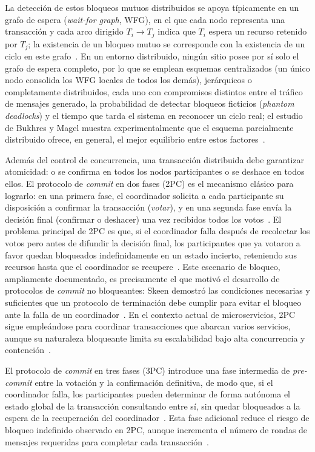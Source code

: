 \documentclass[11pt,a4paper]{article}
\begin{document}
La detecci\'on de estos bloqueos mutuos distribuidos se apoya t\'ipicamente
en un grafo de espera (\emph{wait-for graph}, WFG), en el que cada nodo
representa una transacci\'on y cada arco dirigido $T_i \rightarrow T_j$
indica que $T_i$ espera un recurso retenido por $T_j$; la existencia de un
bloqueo mutuo se corresponde con la existencia de un ciclo en este
grafo~\cite{bukhres1991,ozsu2020}. En un entorno distribuido, ning\'un sitio posee
por s\'i solo el grafo de espera completo, por lo que se emplean esquemas
centralizados (un \'unico nodo consolida los WFG locales de todos los
dem\'as), jer\'arquicos o completamente distribuidos, cada uno con
compromisos distintos entre el tr\'afico de mensajes generado, la
probabilidad de detectar bloqueos ficticios (\emph{phantom deadlocks}) y el
tiempo que tarda el sistema en reconocer un ciclo real; el estudio de
Bukhres y Magel muestra experimentalmente que el esquema parcialmente
distribuido ofrece, en general, el mejor equilibrio entre estos
factores~\cite{bukhres1991,vansteen2017}.

Adem\'as del control de concurrencia, una transacci\'on distribuida debe
garantizar atomicidad: o se confirma en todos los nodos participantes o se
deshace en todos ellos. El protocolo de \emph{commit} en dos fases (2PC) es
el mecanismo cl\'asico para lograrlo: en una primera fase, el coordinador
solicita a cada participante su disposici\'on a confirmar la transacci\'on
(\emph{votar}), y en una segunda fase env\'ia la decisi\'on final (confirmar
o deshacer) una vez recibidos todos los votos~\cite{fan2020,ozsu2020}. El problema
principal de 2PC es que, si el coordinador falla despu\'es de recolectar los
votos pero antes de difundir la decisi\'on final, los participantes que ya
votaron a favor quedan bloqueados indefinidamente en un estado incierto,
reteniendo sus recursos hasta que el coordinador se recupere~\cite{skeen1981,ozsu2020}.
Este escenario de bloqueo, ampliamente documentado, es precisamente el que
motiv\'o el desarrollo de protocolos de \emph{commit} no bloqueantes: Skeen
demostr\'o las condiciones necesarias y suficientes que un protocolo de
terminaci\'on debe cumplir para evitar el bloqueo ante la falla de un
coordinador~\cite{skeen1981}. En el contexto actual de microservicios, 2PC
sigue emple\'andose para coordinar transacciones que abarcan varios
servicios, aunque su naturaleza bloqueante limita su escalabilidad bajo alta
concurrencia y contenci\'on~\cite{fan2020}.

El protocolo de \emph{commit} en tres fases (3PC) introduce una fase
intermedia de \emph{pre-commit} entre la votaci\'on y la confirmaci\'on
definitiva, de modo que, si el coordinador falla, los participantes pueden
determinar de forma aut\'onoma el estado global de la transacci\'on
consultando entre s\'i, sin quedar bloqueados a la espera de la
recuperaci\'on del coordinador~\cite{kumar2014,skeen1981}. Esta fase adicional reduce
el riesgo de bloqueo indefinido observado en 2PC, aunque incrementa el
n\'umero de rondas de mensajes requeridas para completar cada
transacci\'on~\cite{kumar2014}.
\end{document}
